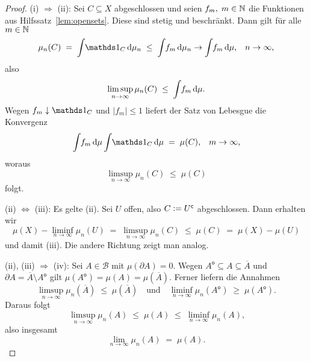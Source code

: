 \documentclass[../main/main.tex]{subfiles}
\begin{document}
	\begin{proof}
		(i) $\Rightarrow$ (ii): Sei $C \subseteq X$ abgeschlossen und seien 
		$f_m, \; m \in \mathbb{N}$ die Funktionen aus Hilfssatz~\ref{lem:opensets}. 
		Diese sind stetig und beschränkt.
		Dann gilt für alle $m \in \mathbb{N}$
		$$\mu_n(C) \; = \; \measureint{}{\indfct_C}{\mu_n} \; \leq \; 
			\measureint{}{f_m}{\mu_n} \to 
			\measureint{}{f_m}{\mu} \text{,} \quad n \to \infty \text{,}$$
		also 
		$$\limsup_{n \to \infty} \mu_n(C) \; \leq \; 
			\int_{} \, f_m \, \mathrm{d}\mu \text{.}$$
		Wegen $f_m \convdown \indfct_C$ und $| f_m | \leq 1$ 
		liefert der Satz von Lebesgue die Konvergenz
		$$\measureint{}{f_m}{\mu} 
			\measureint{}{\indfct_C}{\mu} \; = \; \mu(C) \text{,} \quad m \to \infty \text{,}$$
		woraus
		$$\limsup_{n \to \infty} \mu_n(C) \; \leq \; \mu(C)$$
		folgt.
		
		(ii) $\Leftrightarrow$ (iii): Es gelte (ii). Sei $U$ offen, also 
		$C \vcentcolon = U^\mathsf{c}$ abgeschlossen. Dann erhalten wir
		$$\mu(X) - \liminf_{n \to \infty} \mu_n(U) \; = \; 
			\limsup_{n \to \infty} \mu_n(C) \; \leq \; 
			\mu(C) \; = \; \mu(X) - \mu(U)$$
		und damit (iii). Die andere Richtung zeigt man analog.
		
		(ii), (iii) $\Rightarrow$ (iv): Sei $A \in \mathcal{B}$ mit 
		$\mu(\partial A) = 0$. Wegen
		$A^\mathsf{o} \subseteq A \subseteq \overline{A}$ und 
			$\partial A = \overline{A} \setminus A^\mathsf{o}$ gilt $\mu(A^\mathsf{o}) = 
			\mu(A) = \mu(\overline{A}) \text{.}$
		Ferner liefern die Annahmen
		$$\limsup_{n \to \infty} \mu_n(\overline{A}) \; \leq \; 
			\mu(\overline{A}) \quad \text{und} \quad 
			\liminf_{n \to \infty} \mu_n(A^\mathsf{o}) \; \geq \; 
			\mu(A^\mathsf{o}) \text{.}$$
		Daraus folgt
		$$\limsup_{n \to \infty} \mu_n(A) \; \leq \; 
		\mu(A) \; \leq \; \liminf_{n \to \infty} \mu_n(A) \text{,}$$
		also insgesamt
		$$\lim_{n \to \infty} \mu_n(A) \; = \; \mu(A) \text{.}$$
		

\end{proof}
\end{document}
